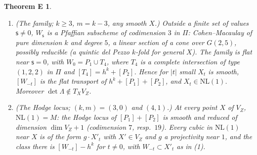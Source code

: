 \documentclass[10pt]{article}
\numberwithin{equation}{section}
\newtheorem*{thmE}{Theorem E}
\theoremstyle{remark}
\newcommand{\NL}{\mathrm{NL}}
\newcommand{\VZ}{V_Z}
\begin{document}
\begin{thmE}
\begin{enumerate}[label=\textup{(\arabic*)}]
\item \textup{(The family; $k\ge3$, $m=k-3$, any smooth $X$.)} Outside a finite set of values
$\mathsf s\ne0$, $W_{\mathsf s}$ is a Pfaffian subscheme of codimension $3$ in $\Pi$: Cohen--Macaulay of pure
dimension $k$ and degree $5$, a linear section of a cone over $G(2,5)$, possibly reducible \textup{(}a quintic
del Pezzo $k$-fold for general $X$\textup{)}. The family is flat near $\mathsf s=0$, with $W_0=P_1\cup T_4$, where $T_4$ is a
complete intersection of type $(1,2,2)$ in $\Pi$ and $[T_4]=h^k+[P_2]$. Hence for $|t|$ small $X_t$ is smooth,
$[W_{-t}]$ is the flat transport of $h^k+[P_1]+[P_2]$, and $X_t\in\NL(1)$. Moreover $\det\Lambda\notin T_X\VZ$.
\item \textup{(The Hodge locus; $(k,m)=(3,0)$ and $(4,1)$.)} At every point $X$ of $\VZ$, $\NL(1)=M$: the
Hodge locus of $[P_1]+[P_2]$ is smooth and reduced of dimension $\dim\VZ+1$ \textup{(}codimension $7$, resp.\
$19$\textup{)}. Every cubic in $\NL(1)$ near $X$ is of the form $g\cdot X'_t$ with $X'\in\VZ$ and $g$ a
projectivity near $1$, and the class there is $[W_{-t}]-h^k$ for $t\ne0$, with $W_{-t}\subset X'_t$ as in
\textup{(1)}.
\end{enumerate}
\end{thmE}
\end{document}
